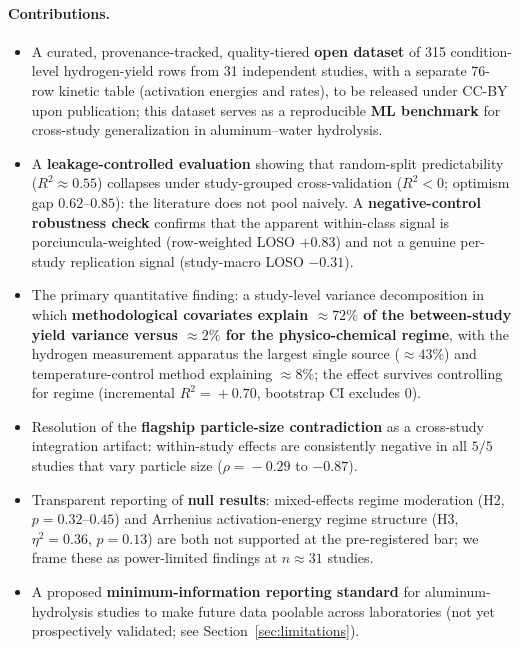 \paragraph{Contributions.}
\begin{itemize}\itemsep2pt
  \item A curated, provenance-tracked, quality-tiered \textbf{open dataset} of 315
  condition-level hydrogen-yield rows from 31 independent studies, with a separate
  76-row kinetic table (activation energies and rates), to be released under CC-BY upon publication; this
  dataset serves as a reproducible \textbf{ML benchmark} for cross-study generalization
  in aluminum--water hydrolysis.
  \item A \textbf{leakage-controlled evaluation} showing that random-split predictability
  ($R^2\!\approx\!0.55$) collapses under study-grouped cross-validation ($R^2<0$; optimism
  gap $0.62$--$0.85$): the literature does not pool naively. A \textbf{negative-control
  robustness check} confirms that the apparent within-class signal is porciuncula-weighted
  (row-weighted LOSO $+0.83$) and not a genuine per-study replication signal (study-macro
  LOSO $-0.31$).
  \item The primary quantitative finding: a study-level variance decomposition in which
  \textbf{methodological covariates explain $\approx\!72\%$ of the between-study yield
  variance versus $\approx\!2\%$ for the physico-chemical regime}, with the
  hydrogen measurement apparatus the largest single source ($\approx\!43\%$) and
  temperature-control method explaining $\approx\!8\%$; the effect survives controlling for
  regime (incremental $R^2\!=\!+0.70$, bootstrap CI excludes 0).
  \item Resolution of the \textbf{flagship particle-size contradiction} as a cross-study
  integration artifact: within-study effects are consistently negative in all $5/5$
  studies that vary particle size ($\rho\!=\!-0.29$ to $-0.87$).
  \item Transparent reporting of \textbf{null results}: mixed-effects regime moderation
  (H2, $p\!=\!0.32$--$0.45$) and Arrhenius activation-energy regime structure (H3,
  $\eta^2\!=\!0.36$, $p\!=\!0.13$) are both not supported at the pre-registered bar;
  we frame these as power-limited findings at $n\!\approx\!31$ studies.
  \item A proposed \textbf{minimum-information reporting standard} for aluminum-hydrolysis
  studies to make future data poolable across laboratories (not yet prospectively
  validated; see Section~\ref{sec:limitations}).
\end{itemize}
